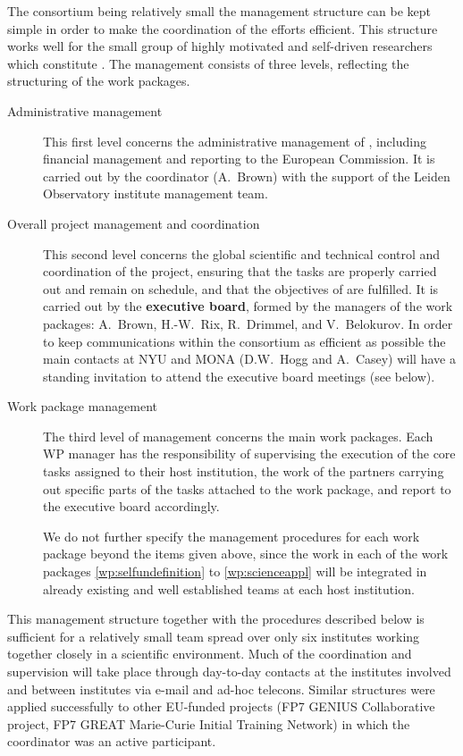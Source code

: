 The {\acro} consortium being relatively small the management structure can be kept simple in order to make the coordination of the efforts efficient. This structure works well for the small group of highly motivated and self-driven researchers which constitute {\acro}. The management consists of three levels, reflecting the structuring of the {\acro} work packages.
\begin{description}
    \item[Administrative management] This first level concerns the administrative management of {\acro}, including financial management and reporting to the European Commission. It is carried out by the {\acro} coordinator (A.~Brown) with the support of the Leiden Observatory institute management team.
    \item[Overall project management and coordination] This second level concerns the global scientific and technical control and coordination of the project, ensuring that the tasks are properly carried out and remain on schedule, and that the objectives of {\acro} are fulfilled. It is carried out by the \textbf{{\acro} executive board}, formed by the managers of the work packages: A.~Brown, H.-W.~Rix, R.~Drimmel, and V.~Belokurov. In order to keep communications within the consortium as efficient as possible the main contacts at NYU and MONA (D.W.~Hogg and A.~Casey) will have a standing invitation to attend the executive board meetings (see below).
    \item[Work package management] The third level of management concerns the main work packages. Each WP manager has the responsibility of supervising the execution of the core tasks assigned to their host institution, the work of the partners carrying out specific parts of the tasks attached to the work package, and report to the executive board accordingly.
    
    We do not further specify the management procedures for each work package beyond the items given above, since the work in each of the work packages \ref{wp:selfundefinition} to \ref{wp:scienceappl} will be integrated in already existing and well established teams at each host institution.
\end{description}

This management structure together with the procedures described below is sufficient for a relatively small team spread over only six institutes working together closely in a scientific environment. Much of the coordination and supervision will take place through day-to-day contacts at the institutes involved and between institutes via e-mail and ad-hoc telecons. Similar structures were applied successfully to other EU-funded projects (FP7 GENIUS Collaborative project, FP7 GREAT Marie-Curie Initial Training Network) in which the {\acro} coordinator was an active participant.

